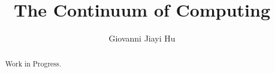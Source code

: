 \documentclass{ieeeaccess}
\begin{document}

\title{The Continuum of Computing}
\author{Giovanni Jiayi Hu}
\address[1]{Department of Mathematics, University of Padua, Italy I-35121}

\begin{abstract}
Work in Progress.
\end{abstract}

\titlepgskip=-15pt

\maketitle





\EOD
\end{document}
